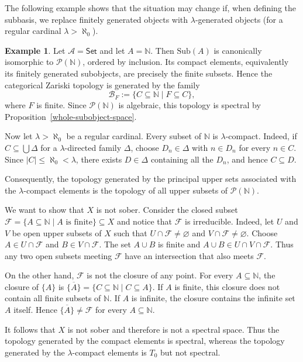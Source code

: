 \documentclass{amsproc}
\theoremstyle{definition}
\newtheorem{example}[theorem]{Example}
\theoremstyle{plain}
\theoremstyle{remark}
\numberwithin{equation}{section}
\newcommand{\Cal}[1]{{\mathcal #1}}
\newcommand{\sub}[1]{\mathrm{Sub} (#1)}
\begin{document}
The following example shows that the situation may change if, when defining the subbasis, we replace finitely generated objects with $\lambda$-generated objects (for a regular cardinal $\lambda > \aleph_0$).

\begin{example}\label{powerset-example}
Let $\mathscr A=\mathsf{Set}$ and let $A=\mathbb N$. Then $\sub A$ is canonically isomorphic to $\Cal P(\mathbb N)$, ordered by inclusion. Its compact elements, equivalently its finitely generated subobjects, are precisely the finite subsets. Hence the categorical Zariski topology is generated by the family
$$
\Cal B_F:=\{C\subseteq\mathbb N\mid F\subseteq C\},
$$
where $F$ is finite. Since $\Cal P(\mathbb N)$ is algebraic, this topology is spectral by Proposition~\ref{whole-subobject-space}.

Now let $\lambda>\aleph_0$ be a regular cardinal. Every subset of $\mathbb N$ is $\lambda$-compact. Indeed, if $C\subseteq\bigcup\Delta$ for a $\lambda$-directed family $\Delta$, choose $D_n\in\Delta$ with $n\in D_n$ for every $n\in C$. Since $|C|\leq\aleph_0<\lambda$, there exists $D\in\Delta$ containing all the $D_n$, and hence $C\subseteq D$.

Consequently, the topology generated by the principal upper sets associated with the $\lambda$-compact elements is the topology of all upper subsets of $\Cal P(\mathbb N)$. 

We want to show that $X$ is not sober. Consider the closed subset $\mathcal{F}=\{A\subseteq\mathbb{N}\mid A\text{ is finite}\}\subseteq X$ and notice that $\mathcal{F}$ is irreducible. Indeed, let $U$ and $V$ be open upper subsets of $X$ such that $U\cap\mathcal{F}\neq\varnothing$ and $V\cap\mathcal{F}\neq\varnothing$. Choose $A\in U\cap\mathcal{F}$ and $B\in V\cap\mathcal{F}$. The set $A\cup B$ is finite and $A\cup B\in U\cap V\cap\mathcal{F}$. Thus any two open subsets meeting $\mathcal{F}$ have an intersection that also meets $\mathcal{F}$.

On the other hand, $\mathcal{F}$ is not the closure of any point. For every $A\subseteq\mathbb{N}$, the closure of $\{A\}$ is $\overline{\{A\}}=\{C\subseteq\mathbb{N}\mid C\subseteq A\}$. If $A$ is finite, this closure does not contain all finite subsets of $\mathbb{N}$. If $A$ is infinite, the closure contains the infinite set $A$ itself. Hence $\overline{\{A\}}\neq\mathcal{F}$ for every $A\subseteq\mathbb{N}$.

It follows that $X$ is not sober and therefore is not a spectral space. Thus the topology generated by the compact elements is spectral, whereas the topology generated by the $\lambda$-compact elements is $T_0$ but not spectral.
\end{example}
\end{document}

